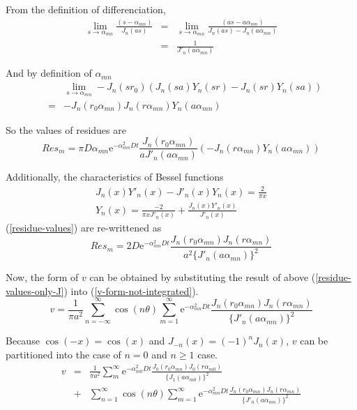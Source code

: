 \documentclass{article}
\begin{document}
From the definition of differenciation,
\begin{eqnarray}
    \lim_{s\to\alpha_{mn}}\frac{(s-\alpha_{mn})}{J_n(as)}
    &=& \lim_{s\to\alpha_{mn}} \frac{(as-a\alpha_{mn})}{J_n(as) - J_n(a\alpha_{mn})}\nonumber \\
    &=& \frac{1}{J'_n(a\alpha_{mn})}\nonumber
\end{eqnarray}

And by definition of $\alpha_{mn}$
\begin{eqnarray}
    & & \lim_{s\to\alpha_{mn}}-J_n(sr_0)(J_n(sa)Y_n(sr) - J_n(sr)Y_n(sa)) \nonumber \\
    &=& -J_n(r_0\alpha_{mn})J_n(r\alpha_{mn})Y_n(a\alpha_{mn})
\end{eqnarray}

So the values of residues are
\begin{equation}\label{residue-values}
    Res_m = \pi D\alpha_{mn}\mathrm{e}^{-\alpha_{mn}^2Dt}
    \frac{J_n(r_0\alpha_{mn})}{aJ'_n(a\alpha_{mn})}(- J_n(r\alpha_{mn})Y_n(a\alpha_{mn}))
\end{equation}

Additionally, the characteristics of Bessel functions
\begin{eqnarray}
    J_n(x)Y'_n(x) - J'_n(x)Y_n(x) = \frac{2}{\pi x} \nonumber \\
    Y_n(x) = \frac{-2}{\pi xJ'_n(x)} + \frac{J_n(x)Y'_n(x)}{J'_n(x)}
\end{eqnarray}
(\ref{residue-values}) are re-writtened as
\begin{equation}\label{residue-values-only-J}
    Res_m = 2D\mathrm{e}^{-\alpha_{mn}^2Dt}
    \frac{J_n(r_0\alpha_{mn})J_n(r\alpha_{mn})}{a^2\{J'_n(a\alpha_{mn})\}^2}
\end{equation}

Now, the form of $v$ can be obtained by substituting the result of above (\ref{residue-values-only-J}) into
(\ref{v-form-not-integrated}).
\begin{equation}
    v = \frac{1}{\pi a^2}
        \sum_{n=-\infty}^{\infty}\cos(n\theta)
        \sum_{m=1}^{\infty}\mathrm{e}^{-\alpha_{mn}^2Dt}
        \frac{J_n(r_0\alpha_{mn})J_n(r\alpha_{mn})}{\{J'_n(a\alpha_{mn})\}^2}
\end{equation}

Because $\cos(-x) = \cos(x)$ and $J_{-n}(x) = (-1)^nJ_n(x)$, $v$ can be partitioned into the case of $n=0$ and $n \geq 1$ case.
\begin{eqnarray}
  v &=& \frac{1}{\pi a^2}\sum_m^{\infty}\mathrm{e}^{-\alpha_{m0}^2Dt}
        \frac{J_0(r_0\alpha_{mn})J_0(r\alpha_{m0})}{\{J_1(a\alpha_{m0})\}^2} \nonumber \\
    &+& \sum_{n=1}^{\infty}\cos(n\theta)
        \sum_{m=1}^{\infty}\mathrm{e}^{-\alpha_{mn}^2Dt}
        \frac{J_n(r_0\alpha_{mn})J_n(r\alpha_{mn})}{\{J'_n(a\alpha_{mn})\}^2}
\end{eqnarray}
\end{document}
